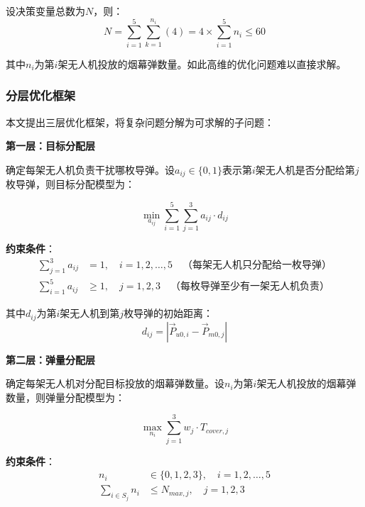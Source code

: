 \documentclass[12pt,a4paper]{article}
\begin{document}
\indent 设决策变量总数为$N$，则：
\begin{equation}
N = \sum_{i=1}^{5} \sum_{k=1}^{n_i} (4) = 4 \times \sum_{i=1}^{5} n_i \leq 60
\end{equation}

\indent 其中$n_i$为第$i$架无人机投放的烟幕弹数量。如此高维的优化问题难以直接求解。

\subsubsection{分层优化框架}

\indent 本文提出三层优化框架，将复杂问题分解为可求解的子问题：

\noindent\textbf{第一层：目标分配层}

\indent 确定每架无人机负责干扰哪枚导弹。设$a_{ij} \in \{0, 1\}$表示第$i$架无人机是否分配给第$j$枚导弹，则目标分配模型为：

\begin{equation}
\min_{a_{ij}} \sum_{i=1}^{5} \sum_{j=1}^{3} a_{ij} \cdot d_{ij}
\end{equation}

\noindent\textbf{约束条件}：
\begin{align}
\sum_{j=1}^{3} a_{ij} &= 1, \quad i = 1, 2, \ldots, 5 \quad \text{（每架无人机只分配给一枚导弹）} \\
\sum_{i=1}^{5} a_{ij} &\geq 1, \quad j = 1, 2, 3 \quad \text{（每枚导弹至少有一架无人机负责）}
\end{align}

\indent 其中$d_{ij}$为第$i$架无人机到第$j$枚导弹的初始距离：
\begin{equation}
d_{ij} = |\vec{P}_{u0,i} - \vec{P}_{m0,j}|
\end{equation}

\noindent\textbf{第二层：弹量分配层}

\indent 确定每架无人机对分配目标投放的烟幕弹数量。设$n_i$为第$i$架无人机投放的烟幕弹数量，则弹量分配模型为：

\begin{equation}
\max_{n_i} \sum_{j=1}^{3} w_j \cdot T_{cover,j}
\end{equation}

\noindent\textbf{约束条件}：
\begin{align}
n_i &\in \{0, 1, 2, 3\}, \quad i = 1, 2, \ldots, 5 \\
\sum_{i \in S_j} n_i &\leq N_{max,j}, \quad j = 1, 2, 3
\end{align}
\end{document}
